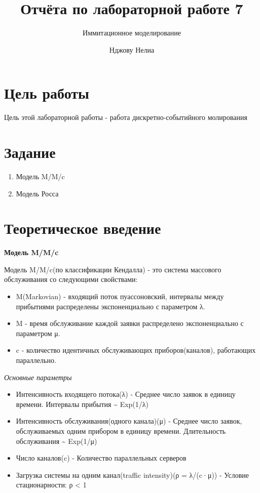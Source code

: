 \documentclass[
  12pt,
  a4paper,
  DIV=11,
  numbers=noendperiod]{scrreprt}
\title{Отчёта по лабораторной работе 7}
\subtitle{Иммитационное моделирование}
\author{Нджову Нелиа}
\date{}
\renewcommand*\contentsname{Содержание}
\newcommand\contentsname{Содержание}
\begin{document}
\maketitle

\renewcommand*\contentsname{Содержание}
{
\setcounter{tocdepth}{1}
\tableofcontents
}
\listoffigures
\listoftables
{}
\chapter{Цель
работы}\label{ux446ux435ux43bux44c-ux440ux430ux431ux43eux442ux44b}

Цель этой лабораторной работы - работа дискретно-событийного молирования

\chapter{Задание}\label{ux437ux430ux434ux430ux43dux438ux435}

\begin{enumerate}
\def\labelenumi{\arabic{enumi}.}
\item
  Модель M/M/c
\item
  Модель Росса
\end{enumerate}

\chapter{Теоретическое
введение}\label{ux442ux435ux43eux440ux435ux442ux438ux447ux435ux441ux43aux43eux435-ux432ux432ux435ux434ux435ux43dux438ux435}

\textbf{Модель M/M/c}

Модель M/M/c(по классификации Кендалла) - это система массового
обслуживания со следующими свойствами:

\begin{itemize}
\item
  M(Markovian) - входящий поток пуассоновский, интервалы между
  прибытиями распределены экспоненциально с параметром λ.
\item
  M - время обслуживание каждой заявки распределено экспоненциально с
  параметром μ.
\item
  c - количество идентичных обслуживающих приборов(каналов), работающих
  параллельно.
\end{itemize}

\emph{Основные параметры}

\begin{itemize}
\item
  Интенсивность входящего потока(λ) - Среднее число заявок в единицу
  времени. Интервалы прибытия \textasciitilde{} Exp(1/λ)
\item
  Интенсивность обслуживания(одного канала)(μ) - Среднее число заявок,
  обслуживаемых одним прибором в единицу времени. Длительность
  обслуживания \textasciitilde{} Exp(1/μ)
\item
  Число каналов(c) - Количество параллельных серверов
\item
  Загрузка системы на одним канал(traffic intensity)(ρ = λ/(c·μ)) -
  Условие стационарности: ρ \textless{} 1
\end{itemize}
\end{document}
